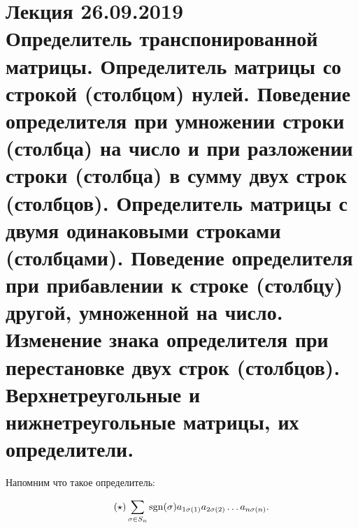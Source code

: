 \section{Лекция 26.09.2019 \\ Определитель транспонированной матрицы. Определитель матрицы со строкой (столбцом) нулей. Поведение определителя при умножении строки (столбца) на число и при разложении строки (столбца) в сумму двух строк (столбцов). Определитель матрицы с двумя одинаковыми строками (столбцами). Поведение определителя при прибавлении к строке (столбцу) другой, умноженной на число. Изменение знака определителя при перестановке двух строк (столбцов). Верхнетреугольные и нижнетреугольные матрицы, их определители.}

Напомним что такое определитель:

\begin{equation}
    \label{det:sum}
    \tag{$\star$}
    \sum_{\sigma \in S_n} \operatorname{\mathop{\mathrm{sgn}}}(\sigma) a_{1\sigma(1)} a_{2\sigma(2)} \dots a_{n\sigma(n)}
.\end{equation}

\setcounter{theorem}{1}
\begin{comment}
    Каждое слагаемое содержит ровно 1 элемент из каждой строки и ровно 1 элемент из каждого столбца.
\end{comment}


